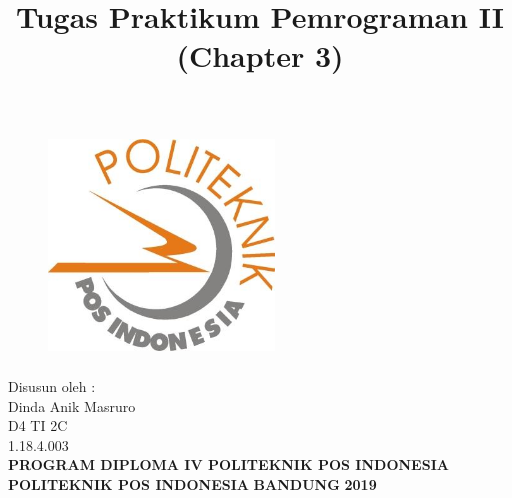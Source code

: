 \documentclass[a4paper, 12pt]{article}
\begin{document}
\title{\huge\textbf{Tugas Praktikum Pemrograman II (Chapter 3)}}
\date{}

\maketitle


\begin{figure}[!ht]
\begin{center}
\includegraphics[width = 6cm, height = 6cm]{gambar/poltekpos.jpg}
\end{center}
\end{figure}

\begin{center}
\vspace{1cm}
Disusun oleh :\\
Dinda Anik Masruro\\
D4 TI 2C\\
1.18.4.003\\
\vspace{1cm}
\textbf{PROGRAM DIPLOMA IV POLITEKNIK POS INDONESIA} \linebreak
\textbf{POLITEKNIK POS INDONESIA} \linebreak
\textbf{BANDUNG}\linebreak
\textbf{2019}

\end{center}


\thispagestyle{empty}


\end{document}
